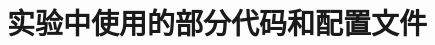 

\cleardoublepage

\chapter{实验中使用的部分代码和配置文件}
\label{cha:sourcecode}

%
%
%
%
%
%
%
%
%
%
%
%
%
%
%
%
